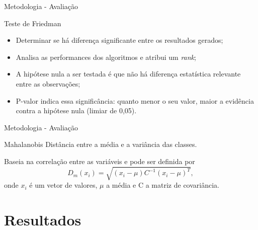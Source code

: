 \documentclass{beamer}
\begin{document}
\begin{frame}{Metodologia - Avaliação}
\setlength\leftmargini{1em}
\begin{block}{Teste de Friedman}
\begin{itemize}
\item Determinar se há diferença significante entre os resultados gerados;
\item Analisa as performances dos algoritmos e atribui um \textit{rank};
\item A hipótese nula a ser testada é que não há diferença estatística relevante entre as observações;
\item P-valor indica essa significância: quanto menor o seu valor, maior a evidência contra a hipótese nula (limiar de 0,05).
\end{itemize}
\end{block}
\end{frame}
\begin{frame}{Metodologia - Avaliação}
\justifying
\setlength\leftmargini{1em}
\begin{block}{Mahalanobis}  %
Distância entre a média e a variância das classes. 
\vspace{4pt}

Baseia na correlação entre as variáveis e pode ser definida por
\begin{equation*}
  D_m(x_i) = \sqrt{(x_i - \mu)C^{-1}(x_i-\mu)^T},
\end{equation*}
\noindent onde $x_i$ é um vetor de valores, $\mu$ a média e C a matriz de covariância.
\end{block}
\end{frame}
\section{Resultados}
\end{document}
